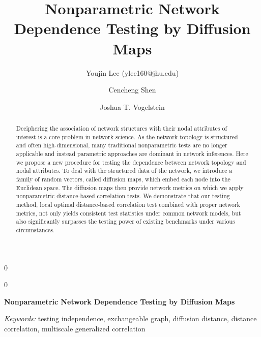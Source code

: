 \documentclass[11pt]{article}
\theoremstyle{definition}
\newcommand{\blind}{0}
\begin{document}
\def\spacingset#1{\renewcommand{\baselinestretch}%
{#1}\small\normalsize} \spacingset{1}

\title{\bf Nonparametric Network Dependence Testing by Diffusion Maps}
\blind
{\author[1]{Youjin Lee (ylee160@jhu.edu)} %
	\author[2]{Cencheng Shen} %
	\author[2,3,4]{Joshua T. Vogelstein}
  \date{}
	\maketitle
} \fi

	\blind
	{
		\bigskip
		\bigskip
		\bigskip
		\begin{center}
			{\LARGE\bf Nonparametric Network Dependence Testing by Diffusion Maps}
		\end{center}
		\medskip
	} \fi

\begin{abstract}
Deciphering the association of network structures with their nodal attributes of interest is a core problem in network science. As the network topology is structured and often high-dimensional, many traditional nonparametric tests are no longer applicable and instead parametric approaches are dominant in network inferences. Here we propose a new procedure for testing the dependence between network topology and nodal attributes. To deal with the structured data of the network, we introduce a family of random vectors, called diffusion maps, which embed each node into the Euclidean space. The diffusion maps then provide network metrics on which we apply nonparametric distance-based correlation tests. We demonstrate that our testing method, local optimal distance-based correlation test combined with proper network metrics, not only yields consistent test statistics under common network models, but also significantly surpasses the testing power of existing benchmarks under various circumstances.
\end{abstract}

\noindent%
{\it Keywords:} testing independence, exchangeable graph, diffusion distance, distance correlation, multiscale generalized correlation
\end{document}
